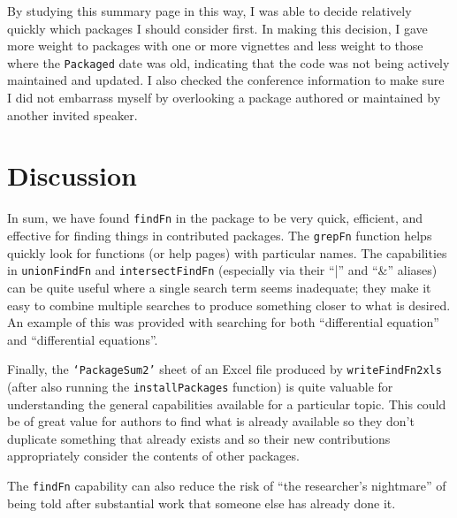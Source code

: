 By studying this summary page in this way, I was able to decide
relatively quickly which packages I should consider first.  In
making this decision, I gave more weight to packages with
one or more vignettes and less weight to those where the
{\tt Packaged} date was old, indicating that the code was not being
actively maintained and updated.  I also checked the conference
information to make sure I did not embarrass myself by overlooking
a package authored or maintained by another invited speaker.

\section{Discussion}
In sum, we have found {\tt findFn} in the  package to
be very quick, efficient, and effective for finding things in
contributed packages.  The {\tt grepFn} function helps quickly
look for functions (or help pages) with particular names.
The capabilities in {\tt unionFindFn} and {\tt intersectFindFn}
(especially via their ``|'' and ``\&'' aliases) can be quite useful
where a single search term seems inadequate;  they make it easy
to combine multiple searches to produce something closer to what
is desired.  An example of this was provided with searching for
both ``differential equation'' and ``differential equations''.

Finally, the {\tt `PackageSum2'} sheet of an Excel file produced by
{\tt writeFindFn2xls} (after also running the {\tt installPackages}
function) is quite valuable for understanding the
general capabilities available for a particular topic.
This could be of great value for authors to find what is already
available so they don't duplicate something that already exists
and so their new contributions appropriately consider
the contents of other packages.

The {\tt findFn} capability can also reduce the risk
of ``the researcher's nightmare'' of being told after
substantial work that someone else has already done it.

